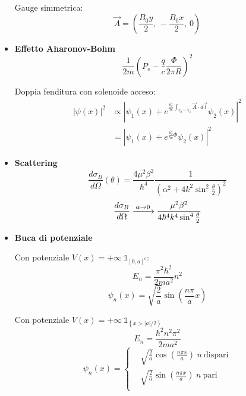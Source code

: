 \documentclass{article}
\newcommand{\myrightarrow}[1]{\xrightarrow{\makebox[2em][c]{$\scriptstyle#1$}}}
\begin{document}
\begin{small}
\begin{multicols*}{3}
\begin{itemize}[leftmargin=*]
		Gauge simmetrica:
		\[\vec{A} = \left(\frac{B_0y}{2},\, -\frac{B_0x}{2},\,0\right)\]

	\item \textbf{Effetto Aharonov-Bohm}
		\[\frac{1}{2m}\left(P_s - \frac{q}{c}\frac{\Phi }{2\pi R}\right)^2\]

		Doppia fenditura con solenoide acceso:
		\begin{align*}\left|\psi (x)\right|^2 &\propto \left|\psi _1(x) + e^{\frac{iq}{\hbar c} \int_{\gamma _2-\gamma _1}\vec{A}\cdot d\vec{l}} \psi _2(x)\right|^2  \\
		&=\left| \psi _1(x) + e^{\frac{iq}{\hbar c} \Phi } \psi _2(x)\right|^2 \end{align*}

	\item \textbf{Scattering}
		\[\frac{d\sigma _B}{d\Omega }(\theta ) = \frac{4\mu ^2\beta ^2}{\hbar ^4} \frac{1}{\left(\alpha ^2 + 4k^2\sin^2\frac{\theta }{2}\right)^2}\]
		\[\frac{d\sigma _B}{d\Omega } \myrightarrow{\alpha  \rightarrow 0} \frac{\mu ^2\beta ^2}{4\hbar ^4k^4\sin^4{\frac{\theta }{2}}}\]


	\item \textbf{Buca di potenziale}

		Con potenziale $V(x) = +\infty \,\mathds{1}_{[0,a]^c}$:
		\[E_n = \frac{\pi ^2\hbar ^2}{2ma^2}n^2\]
		\[\psi _n(x) = \sqrt{\frac{2}{a}} \sin\left(\frac{n\pi }{a}x\right)\]

		Con potenziale $V(x) = +\infty \, \mathds{1}_{\left\{x > |a|/2\right\}}$
		\[E_n = \frac{\hbar ^2n^2\pi ^2}{2ma^2}\]
		\[\psi _n(x) = \left\{\begin{aligned}
		&\sqrt{\frac{2}{a}}\cos\left(\frac{n\pi x}{a}\right)\hspace{3pt}n\ \mathrm{dispari}\\
		&\sqrt{\frac{2}{a}}\sin\left(\frac{n\pi x}{a}\right)\hspace{3pt}n\ \mathrm{pari}\\
		\end{aligned}\right.\]




\end{itemize}
\end{multicols*}
\end{small}
\end{document}
